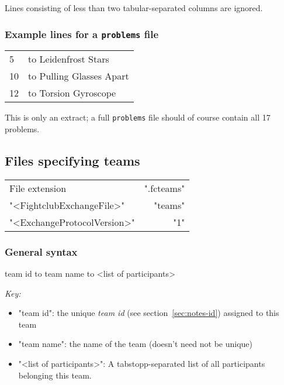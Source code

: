\documentclass[11pt]{ltxdoc}
\newlength{\ccharwidth}
\def\tab{\hbox to \ccharwidth {{\rmfamily\small\mapsto}}}
\begin{document}
    \smallskip
    Lines consisting of less than two tabular-separated columns are ignored.
    
    
    \subsubsection*{Example lines for a \texttt{problems} file}
    \begin{ttfamily}
        \begin{tabular}{@{}l>{\tab}l}%
            5  & Leidenfrost Stars \\
            10 & Pulling Glasses Apart \\
            12 & Torsion Gyroscope
        \end{tabular}
    \end{ttfamily}
    
    \bigskip
    This is only an extract; a full \texttt{problems} file should of course contain all 17 problems.
    
    
    
    
    \subsection{Files specifying teams}\label{sec:files-teams}
    \begin{center}
        \begin{tabular}{lr}
            File extension & ".fcteams" \\
            "<FightclubExchangeFile>" & "teams" \\
            "<ExchangeProtocolVersion>" & "1"
        \end{tabular}
    \end{center}
    
    
    \subsubsection*{General syntax}
    \begin{center}\ttfamily
        team id  \tab  team name  \tab  <list of participants>
    \end{center}

    \smallskip
    \textit{Key:}
    \begin{itemize}
        \item "team id": the unique \textit{team id} (see section~\ref{sec:notes-id}) assigned to this team
        \item "team name": the name of the team (doesn't need not be unique)
        \item "<list of participants>": A tabstopp-separated list of all participants belonging this team. 
    \end{itemize}
    
\end{document}
